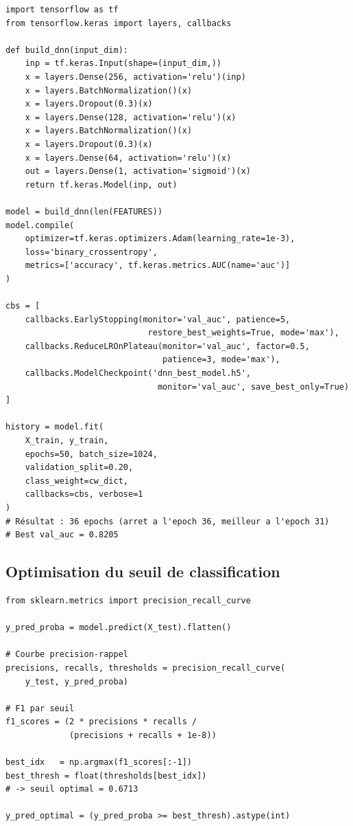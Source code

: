 \begin{lstlisting}[caption=Construction et entraînement du DNN, label=lst:dnn_train]
import tensorflow as tf
from tensorflow.keras import layers, callbacks

def build_dnn(input_dim):
    inp = tf.keras.Input(shape=(input_dim,))
    x = layers.Dense(256, activation='relu')(inp)
    x = layers.BatchNormalization()(x)
    x = layers.Dropout(0.3)(x)
    x = layers.Dense(128, activation='relu')(x)
    x = layers.BatchNormalization()(x)
    x = layers.Dropout(0.3)(x)
    x = layers.Dense(64, activation='relu')(x)
    out = layers.Dense(1, activation='sigmoid')(x)
    return tf.keras.Model(inp, out)

model = build_dnn(len(FEATURES))
model.compile(
    optimizer=tf.keras.optimizers.Adam(learning_rate=1e-3),
    loss='binary_crossentropy',
    metrics=['accuracy', tf.keras.metrics.AUC(name='auc')]
)

cbs = [
    callbacks.EarlyStopping(monitor='val_auc', patience=5,
                             restore_best_weights=True, mode='max'),
    callbacks.ReduceLROnPlateau(monitor='val_auc', factor=0.5,
                                patience=3, mode='max'),
    callbacks.ModelCheckpoint('dnn_best_model.h5',
                               monitor='val_auc', save_best_only=True)
]

history = model.fit(
    X_train, y_train,
    epochs=50, batch_size=1024,
    validation_split=0.20,
    class_weight=cw_dict,
    callbacks=cbs, verbose=1
)
# Résultat : 36 epochs (arret a l'epoch 36, meilleur a l'epoch 31)
# Best val_auc = 0.8205
\end{lstlisting}

\subsection{Optimisation du seuil de classification}

\begin{lstlisting}[caption=Optimisation du seuil via courbe Précision-Rappel, label=lst:threshold]
from sklearn.metrics import precision_recall_curve

y_pred_proba = model.predict(X_test).flatten()

# Courbe precision-rappel
precisions, recalls, thresholds = precision_recall_curve(
    y_test, y_pred_proba)

# F1 par seuil
f1_scores = (2 * precisions * recalls /
             (precisions + recalls + 1e-8))

best_idx   = np.argmax(f1_scores[:-1])
best_thresh = float(thresholds[best_idx])
# -> seuil optimal = 0.6713

y_pred_optimal = (y_pred_proba >= best_thresh).astype(int)
\end{lstlisting}

